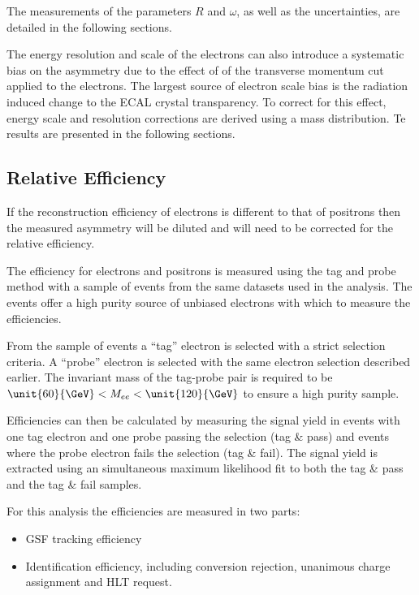 The measurements of the parameters $R$ and $\omega$, as well as the
uncertainties, are detailed in the following sections.

The energy resolution and scale of the electrons can also introduce a systematic
bias on the asymmetry due to the effect of of the transverse momentum cut
applied to the electrons. The largest source of electron scale bias is the
radiation induced change to the ECAL crystal transparency.
To correct for this effect, energy scale and resolution corrections are
derived using a \Zee mass distribution. Te results are presented in the
following sections.

\subsection{Relative Efficiency}

If the reconstruction efficiency of electrons is different to that of positrons
then the measured asymmetry will be diluted and will need to be corrected for
the relative efficiency.

The efficiency for electrons and positrons is measured using the tag and probe
method \cite{tagandprobe}
with a sample of \Zee events from the same datasets used in the analysis. 
The \Zee events offer a high purity source of unbiased electrons with which to
measure the efficiencies.

From the sample of \Zee events a ``tag'' electron is selected with a strict
selection criteria. 
A ``probe'' electron is selected with the same electron selection described
earlier.
The invariant mass of the tag-probe pair is required to be
$\unit{60}{\GeV} < M_{ee} < \unit{120}{\GeV}$ to ensure a high purity sample.

Efficiencies can then be calculated by measuring the signal yield in events
with one tag electron and one probe passing the selection (tag \& pass) and
events where the probe electron fails the selection (tag \& fail).
The signal yield is extracted using an simultaneous maximum likelihood fit to
both the tag \& pass and the tag \& fail samples.

For this analysis the efficiencies are measured in two parts:

\begin{itemize}
    \item GSF tracking efficiency
    \item Identification efficiency, including conversion rejection, unanimous
charge assignment and HLT request.
\end{itemize}

